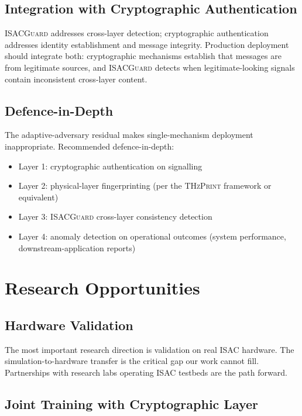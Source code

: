\documentclass[sigconf,nonacm]{acmart}
\begin{document}
\subsection{Integration with Cryptographic Authentication}

\textsc{ISACGuard} addresses cross-layer detection; cryptographic
authentication addresses identity establishment and message
integrity. Production deployment should integrate both:
cryptographic mechanisms establish that messages are from
legitimate sources, and \textsc{ISACGuard} detects when
legitimate-looking signals contain inconsistent cross-layer
content.

\subsection{Defence-in-Depth}

The adaptive-adversary residual makes single-mechanism deployment
inappropriate. Recommended defence-in-depth:

\begin{itemize}
  \item Layer 1: cryptographic authentication on signalling
  \item Layer 2: physical-layer fingerprinting (per the
        \textsc{THzPrint} framework or equivalent)
  \item Layer 3: \textsc{ISACGuard} cross-layer consistency
        detection
  \item Layer 4: anomaly detection on operational outcomes
        (system performance, downstream-application reports)
\end{itemize}

\section{Research Opportunities}

\subsection{Hardware Validation}

The most important research direction is validation on real
ISAC hardware. The simulation-to-hardware transfer is the
critical gap our work cannot fill. Partnerships with research
labs operating ISAC testbeds are the path forward.

\subsection{Joint Training with Cryptographic Layer}
\end{document}
